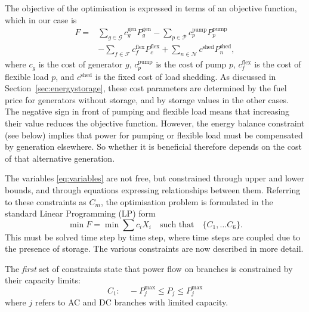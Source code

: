 \documentclass{article}
\begin{document}
The objective of the optimisation is expressed in terms of an objective function, which in our case is
\begin{equation}
\begin{split}
	\label{eq:objectivefunction}
	F = & \sum_{g\in \mathcal{G}} c_g^\text{gen} P^\text{gen}_g 
		- \sum_{p\in \mathcal{P}} c_p^\text{pump} P^\text{pump}_p
		\\ &
		- \sum_{f\in \mathcal{F}} c_f^\text{flex} P_c^\text{flex}		
		+ \sum_{n\in \mathcal{N}} c^\text{shed} P_n^\text{shed},		
\end{split}
\end{equation}
where 
$c_g$ is the cost of generator $g$,
$c_p^\text{pump}$ is the cost of pump $p$,
$c_f^\text{flex}$ is the cost of flexible load $p$,
and 
$c^\text{shed}$ is the fixed cost of load shedding.
As discussed in Section~\ref{sec:energystorage}, these cost parameters are determined by the fuel price for generators without storage, and by storage values in the other cases.
%
The negative sign in front of pumping and flexible load means that increasing their value reduces the objective function. However, the energy balance constraint (see below) implies that power for pumping or flexible load must be compensated by generation elsewhere. So whether it is beneficial therefore depends on the cost of that alternative generation.


The variables \eqref{eq:variables} are not free, but 
constrained through upper and lower bounds, and through equations expressing relationships between them. 
Referring to these constraints as $C_m$, the optimisation problem is formulated in the standard Linear Programming (LP) form
\begin{equation}
	\label{eq:optimisation}
	\min F = \min \sum c_i X_i \quad \text{such that} \quad  \{C_1,\dots C_6\}.
\end{equation}
%
This must be solved time step by time step, where time steps are coupled due to the presence of storage. 
The various constraints are now described in more detail.


The \emph{first} set of constraints state that power flow on branches is constrained by their capacity limits:
\begin{equation}
	C_1:\quad  
	- P_j^\text{max} \le P_j \le P_j^\text{max}
\end{equation}
where $j$ refers to AC and DC branches with limited capacity.
\end{document}
